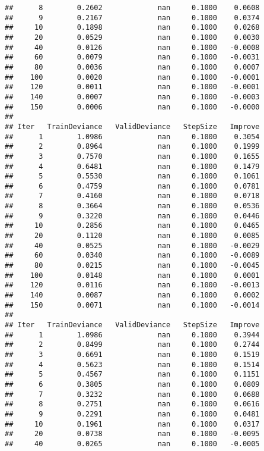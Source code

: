 \documentclass[
]{article}
\begin{document}
\begin{verbatim}
##      8        0.2602             nan     0.1000    0.0608
##      9        0.2167             nan     0.1000    0.0374
##     10        0.1898             nan     0.1000    0.0268
##     20        0.0529             nan     0.1000    0.0030
##     40        0.0126             nan     0.1000   -0.0008
##     60        0.0079             nan     0.1000   -0.0031
##     80        0.0036             nan     0.1000    0.0007
##    100        0.0020             nan     0.1000   -0.0001
##    120        0.0011             nan     0.1000   -0.0001
##    140        0.0007             nan     0.1000   -0.0003
##    150        0.0006             nan     0.1000   -0.0000
## 
## Iter   TrainDeviance   ValidDeviance   StepSize   Improve
##      1        1.0986             nan     0.1000    0.3054
##      2        0.8964             nan     0.1000    0.1999
##      3        0.7570             nan     0.1000    0.1655
##      4        0.6481             nan     0.1000    0.1479
##      5        0.5530             nan     0.1000    0.1061
##      6        0.4759             nan     0.1000    0.0781
##      7        0.4160             nan     0.1000    0.0718
##      8        0.3664             nan     0.1000    0.0536
##      9        0.3220             nan     0.1000    0.0446
##     10        0.2856             nan     0.1000    0.0465
##     20        0.1120             nan     0.1000    0.0085
##     40        0.0525             nan     0.1000   -0.0029
##     60        0.0340             nan     0.1000   -0.0089
##     80        0.0215             nan     0.1000   -0.0045
##    100        0.0148             nan     0.1000    0.0001
##    120        0.0116             nan     0.1000   -0.0013
##    140        0.0087             nan     0.1000    0.0002
##    150        0.0071             nan     0.1000   -0.0014
## 
## Iter   TrainDeviance   ValidDeviance   StepSize   Improve
##      1        1.0986             nan     0.1000    0.3944
##      2        0.8499             nan     0.1000    0.2744
##      3        0.6691             nan     0.1000    0.1519
##      4        0.5623             nan     0.1000    0.1514
##      5        0.4567             nan     0.1000    0.1151
##      6        0.3805             nan     0.1000    0.0809
##      7        0.3232             nan     0.1000    0.0688
##      8        0.2751             nan     0.1000    0.0616
##      9        0.2291             nan     0.1000    0.0481
##     10        0.1961             nan     0.1000    0.0317
##     20        0.0738             nan     0.1000   -0.0095
##     40        0.0265             nan     0.1000   -0.0005

\end{verbatim}
\end{document}

